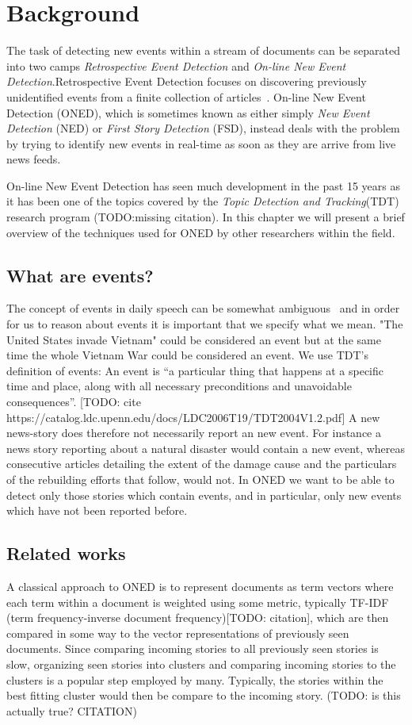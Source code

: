 \chapter{Background}
\label{chapter:background}

The task of detecting new events within a stream of documents can be separated into two camps \emph{Retrospective Event Detection} and \emph{On-line New Event Detection}.Retrospective Event Detection focuses on discovering previously unidentified events from a finite collection of articles~\cite{yang1998study}. On-line New Event Detection (ONED), which is sometimes known as either simply \emph{New Event Detection} (NED) or \emph{First Story Detection} (FSD), instead deals with the problem by trying to identify new events in real-time as soon as they are arrive from live news feeds.

On-line New Event Detection has seen much development in the past 15 years as it has been one of the topics covered by the \emph{Topic Detection and Tracking}(TDT) research program (TODO:missing citation). In this chapter we will present a brief overview of the techniques used for ONED by other researchers within the field.

\section{What are events?}
The concept of events in daily speech can be somewhat ambiguous~\cite{papka1999online} and in order for us to reason about events it is important that we specify what we mean. "The United States invade Vietnam" could be considered an event but at the same time the whole Vietnam War could be considered an event. We use TDT's definition of events: An event is ``a particular thing that happens at a specific time and place, along with all necessary preconditions and unavoidable consequences''. [TODO: cite https://catalog.ldc.upenn.edu/docs/LDC2006T19/TDT2004V1.2.pdf]
A new news-story does therefore not necessarily report an new event. For instance a news story reporting about a natural disaster would contain a new event, whereas consecutive articles detailing the extent of the damage cause and the particulars of the rebuilding efforts that follow, would not. In ONED we want to be able to detect only those stories which contain events, and in particular, only new events which have not been reported before.

\section{Related works}
A classical approach to ONED is to represent documents as term vectors where each term within a document is weighted using some metric, typically TF-IDF (term frequency-inverse document frequency)[TODO: citation], which are then compared in some way to the vector representations of previously seen documents. Since comparing incoming stories to all previously seen stories is slow, organizing seen stories into clusters and comparing incoming stories to the clusters is a popular step employed by many. Typically, the stories within the best fitting cluster would then be compare to the incoming story. (TODO: is this actually true? CITATION)

